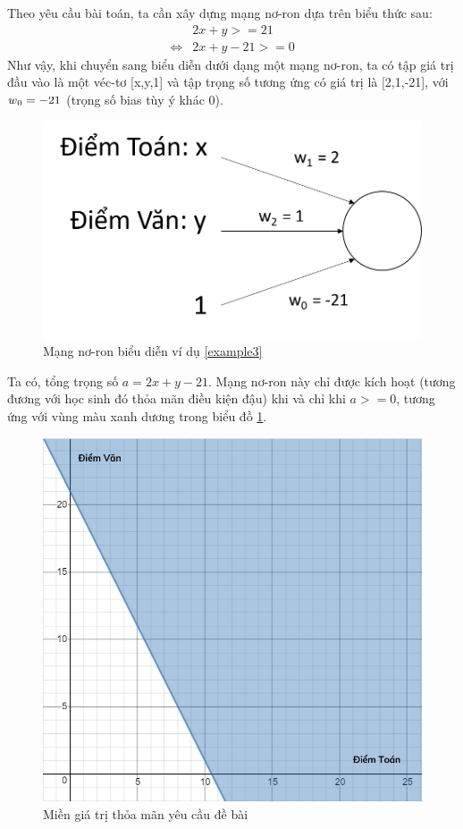 \begin{answ}
Theo yêu cầu bài toán, ta cần xây dựng mạng nơ-ron dựa trên biểu thức sau:
\begin{align*}
  &2x + y >= 21 \\
  \Leftrightarrow &2x + y -21 >= 0
\end{align*}
Như vậy, khi chuyển sang biểu diễn dưới dạng một mạng nơ-ron, ta có tập giá trị đầu vào là một véc-tơ [x,y,1] và tập trọng số tương ứng có giá trị là [2,1,-21], với \(w\textsubscript{0} = -21\) (trọng số bias tùy ý khác 0).

\begin{figure}[h]
	\centering
		\includegraphics[width=0.5\columnwidth]{books/artificial-neural-network/chapter01/figure/example 3.png}
        \caption{Mạng nơ-ron biểu diễn ví dụ \ref{example3}}
		\centering
\end{figure}

Ta có, tổng trọng số \(a = 2x + y - 21\). Mạng nơ-ron này chỉ được kích hoạt (tương đương với học sinh đó thỏa mãn điều kiện đậu) khi và chỉ khi \(a >= 0\), tương ứng với vùng màu xanh dương trong biểu đồ \ref{fig:example3-miengiatri}.

\begin{figure}[!h]
	\centering
		\includegraphics[width=0.55\columnwidth]{books/artificial-neural-network/chapter01/figure/example 3 - graph 1.PNG}
        \caption{Miền giá trị thỏa mãn yêu cầu đề bài}
        \label{fig:example3-miengiatri}
		\centering
\end{figure}


\end{answ}
